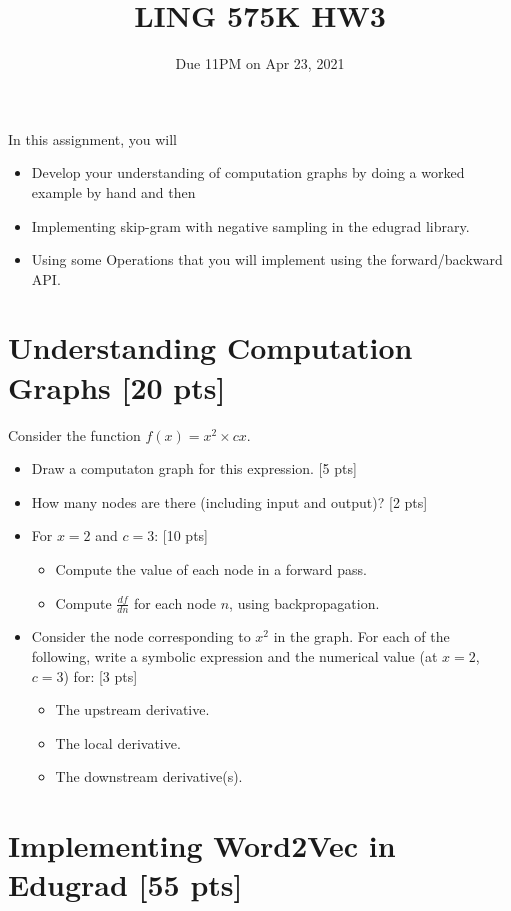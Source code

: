 \documentclass[11pt]{article}
\begin{document}
\title{LING 575K HW3}
\date{\vspace{-0.2in}Due 11PM on Apr 23, 2021}
\maketitle


\noindent In this assignment, you will 
\begin{itemize}
  \item Develop your understanding of computation graphs by doing a worked example by hand and then
  \item Implementing skip-gram with negative sampling in the edugrad library.
  \item Using some Operations that you will implement using the forward/backward API.
\end{itemize}


\section{Understanding Computation Graphs [20 pts]}

  Consider the function $f(x) = x^2 \times cx$.
\begin{itemize}
  \item Draw a computaton graph for this expression. [5 pts]
  \item How many nodes are there (including input and output)? [2 pts]
  \item For $x = 2$ and $c=3$: [10 pts]
    \begin{itemize}
      \item Compute the value of each node in a forward pass.
      \item Compute $\frac{df}{dn}$ for each node $n$, using backpropagation.
    \end{itemize}
  \item Consider the node corresponding to $x^2$ in the graph.  For each of the following, write a symbolic expression and the numerical value (at $x=2$, $c=3$) for: [3 pts]
    \begin{itemize}
      \item The upstream derivative.
      \item The local derivative.
      \item The downstream derivative(s).
    \end{itemize}
\end{itemize}

\section{Implementing Word2Vec in Edugrad [55 pts]}
\end{document}
